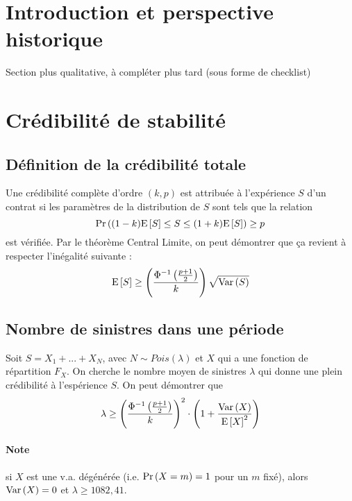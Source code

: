 \documentclass[10pt, french]{article}
\begin{document}
\begin{multicols*}{3} %
\section{Introduction et perspective historique}
Section plus qualitative, à compléter plus tard (sous forme de checklist)




\section{Crédibilité de stabilité}
\subsection*{Définition de la crédibilité totale}
\begin{definition}
Une crédibilité complète d'ordre $(k,p)$ est attribuée à l'expérience $S$ d'un contrat si les paramètres de la distribution de $S$ sont tels que la relation
\[\Pr \left( (1-k)\mathrm{E} \left[ S \right] \leq S \leq (1+k) \mathrm{E} \left[ S \right] \right) \geq p \]
est vérifiée. Par le théorème Central Limite, on peut démontrer que ça revient à respecter l'inégalité suivante : 
\begin{equation}
\mathrm{E} \left[ S \right] \geq \left( \frac{\Phi^{-1}\left(\frac{p+1}{2} \right)}{k} \right) \sqrt{\mathrm{Var} \left( S \right)}
\end{equation}
\end{definition}

\subsection*{Nombre de sinistres dans une période}
Soit $S = X_1 + ... + X_N$, avec $N \sim Pois(\lambda)$ et $X$ qui a une fonction de répartition $F_X$. On cherche le nombre moyen de sinistres $\lambda$ qui donne une plein crédibilité à l'espérience $S$. On peut démontrer que
\begin{equation}
\lambda \geq \left( \frac{\Phi^{-1}\left(\frac{p+1}{2} \right)}{k} \right)^2 \cdot \left(1 + \frac{\mathrm{Var} \left( X \right)}{\mathrm{E} \left[ X \right]^2} \right)
\end{equation}
\paragraph{Note} si $X$ est une v.a. dégénérée (i.e. $\Pr \left( X = m \right) = 1$ pour un $m$ fixé), alors $\mathrm{Var} \left( X \right) = 0$ et $\lambda \geq 1082,41$.


\end{multicols*}
\end{document}
